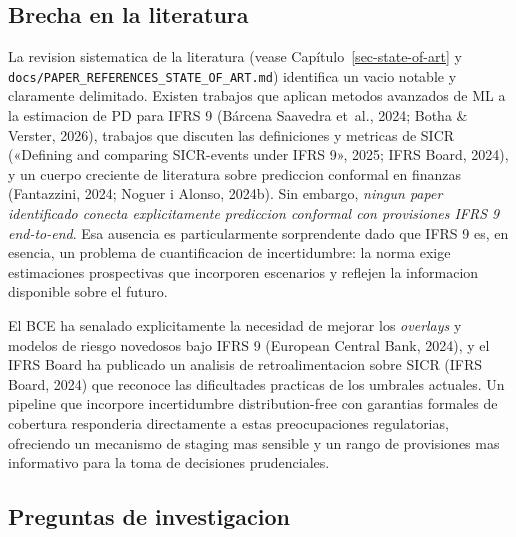 \documentclass[
  spanish,
  11pt,
  letterpaper,
]{scrbook}
\theoremstyle{plain}
\theoremstyle{remark}
\begin{document}
\subsection{Brecha en la literatura}\label{sec-p2-gap}

La revision sistematica de la literatura (vease
Capítulo~\ref{sec-state-of-art} y
\texttt{docs/PAPER\_REFERENCES\_STATE\_OF\_ART.md}) identifica un vacio
notable y claramente delimitado. Existen trabajos que aplican metodos
avanzados de ML a la estimacion de PD para IFRS 9 ({Bárcena Saavedra
et~al.}, 2024; Botha \& Verster, 2026), trabajos que discuten las
definiciones y metricas de SICR ({«Defining and comparing {SICR}-events
under {IFRS} 9»}, 2025; IFRS Board, 2024), y un cuerpo creciente de
literatura sobre prediccion conformal en finanzas (Fantazzini, 2024;
Noguer i Alonso, 2024b). Sin embargo, \emph{ningun paper identificado
conecta explicitamente prediccion conformal con provisiones IFRS 9
end-to-end}. Esa ausencia es particularmente sorprendente dado que IFRS
9 es, en esencia, un problema de cuantificacion de incertidumbre: la
norma exige estimaciones prospectivas que incorporen escenarios y
reflejen la informacion disponible sobre el futuro.

\begin{tcolorbox}[enhanced jigsaw, arc=.35mm, bottomrule=.15mm, bottomtitle=1mm, breakable, colback=white, colbacktitle=quarto-callout-note-color!10!white, colframe=quarto-callout-note-color-frame, coltitle=black, left=2mm, leftrule=.75mm, opacityback=0, opacitybacktitle=0.6, rightrule=.15mm, title=\textcolor{quarto-callout-note-color}{\faInfo}\hspace{0.5em}{Relevancia regulatoria}, titlerule=0mm, toprule=.15mm, toptitle=1mm]

El BCE ha senalado explicitamente la necesidad de mejorar los
\emph{overlays} y modelos de riesgo novedosos bajo IFRS 9 (European
Central Bank, 2024), y el IFRS Board ha publicado un analisis de
retroalimentacion sobre SICR (IFRS Board, 2024) que reconoce las
dificultades practicas de los umbrales actuales. Un pipeline que
incorpore incertidumbre distribution-free con garantias formales de
cobertura responderia directamente a estas preocupaciones regulatorias,
ofreciendo un mecanismo de staging mas sensible y un rango de
provisiones mas informativo para la toma de decisiones prudenciales.

\end{tcolorbox}

\subsection{Preguntas de investigacion}\label{sec-p2-questions}
\end{document}

